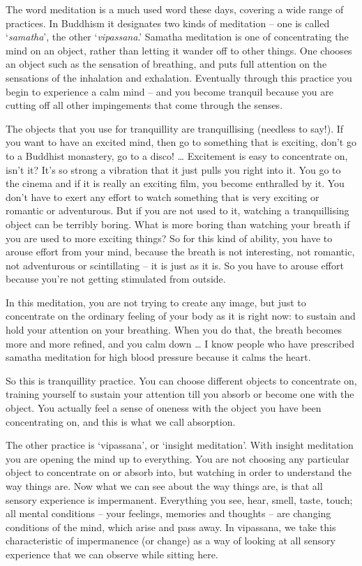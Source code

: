  
The word meditation is a much used word these days, covering a wide range of practices. In Buddhism it designates two kinds of meditation -- one is called `\textit{samatha}', the other `\textit{vipassana}.' Samatha meditation is one of concentrating the mind on an object, rather than letting it wander off to other things. One chooses an object such as the sensation of breathing, and puts full attention on the sensations of the inhalation and exhalation. Eventually through this practice you begin to experience a calm mind -- and you become tranquil because you are cutting off all other impingements that come through the senses.

The objects that you use for tranquillity are tranquillising (needless to say!). If you want to have an excited mind, then go to something that is exciting, don't go to a Buddhist monastery, go to a disco! \ldots{} Excitement is easy to concentrate on, isn't it? It's so strong a vibration that it just pulls you right into it. You go to the cinema and if it is really an exciting film, you become enthralled by it. You don't have to exert any effort to watch something that is very exciting or romantic or adventurous. But if you are not used to it, watching a tranquillising object can be terribly boring. What is more boring than watching your breath if you are used to more exciting things? So for this kind of ability, you have to arouse effort from your mind, because the breath is not interesting, not romantic, not adventurous or scintillating -- it is just as it is. So you have to arouse effort because you're not getting stimulated from outside.

In this meditation, you are not trying to create any image, but just to concentrate on the ordinary feeling of your body as it is right now: to sustain and hold your attention on your breathing. When you do that, the breath becomes more and more refined, and you calm down \ldots{} I know people who have prescribed samatha meditation for high blood pressure because it calms the heart.

So this is tranquillity practice. You can choose different objects to concentrate on, training yourself to sustain your attention till you absorb or become one with the object. You actually feel a sense of oneness with the object you have been concentrating on, and this is what we call absorption.

The other practice is `vipassana', or `insight meditation'. With insight meditation you are opening the mind up to everything. You are not choosing any particular object to concentrate on or absorb into, but watching in order to understand the way things are. Now what we can see about the way things are, is that all sensory experience is impermanent. Everything you see, hear, smell, taste, touch; all mental conditions -- your feelings, memories and thoughts -- are changing conditions of the mind, which arise and pass away. In vipassana, we take this characteristic of impermanence (or change) as a way of looking at all sensory experience that we can observe while sitting here.

